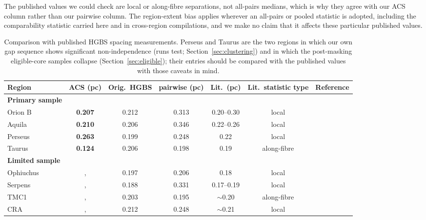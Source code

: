 \documentclass[usenatbib,twoside,twocolumn]{mnras}
\begin{document}
The published values we could check are local or along-fibre separations, not all-pairs medians, which is why they agree with our ACS column rather than our pairwise column. The region-extent bias applies wherever an all-pairs or pooled statistic is adopted, including the comparability statistic carried here and in cross-region compilations, and we make no claim that it affects these particular published values.

\begin{table}
\caption{Comparison with published HGBS spacing measurements. Perseus and Taurus are the two regions in which our own gap sequence shows significant non-independence (runs test; Section~\ref{sec:clustering}) and in which the post-masking eligible-core samples collapse (Section~\ref{sec:eligible}); their entries should be compared with the published values with those caveats in mind.}
\label{tab:literature}
\setlength{\tabcolsep}{4pt}
\footnotesize
\setlength{\tabcolsep}{2.5pt}
\begin{tabular}{lcccccc}
\toprule
Region & ACS (pc) & Orig.\ HGBS & pairwise (pc) & Lit.\ (pc) & \textbf{Lit.\ statistic type} & Reference \\
\midrule
\textbf{Primary sample} &  &  &  &  &  &  \\
Orion B & \textbf{0.207} & 0.212 & 0.313 & 0.20--0.30 & local & \citet{Konyves2020} \\
Aquila  & \textbf{0.210} & 0.206 & 0.346 & 0.22--0.26 & local & \citet{Konyves2015} \\
Perseus & \textbf{0.263} & 0.199 & 0.248 & 0.22 & local & \citet{Pezzuto2021} \\
Taurus  & \textbf{0.124} & 0.206 & 0.198 & 0.19 & along-fibre & \citet{Hacar2013} \\
\midrule
\textbf{Limited sample} &  &  &  &  &  &  \\
Ophiuchus &, & 0.197 & 0.206 & 0.18 & local & \citet{Konyves2020} \\
Serpens  &, & 0.188 & 0.331 & 0.17--0.19 & local & \citet{Konyves2020} \\
TMC1     &, & 0.203 & 0.195 & $\sim$0.20 & along-fibre & \citet{Hacar2013} \\
CRA      &, & 0.212 & 0.248 & $\sim$0.21 & local & \citet{Konyves2020} \\
\bottomrule
\end{tabular}


\end{table}
\end{document}
